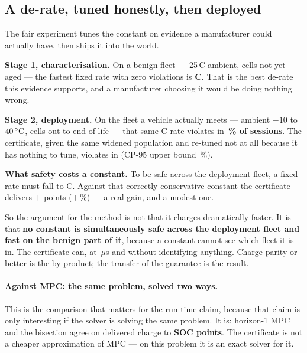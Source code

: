 \documentclass[11pt,letterpaper]{article}
\theoremstyle{definition}
\theoremstyle{remark}
\newcommand{\SI}[2]{#1\,#2}
\newcommand{\degreeCelsius}{\degC}
\newcommand{\degC}{\ifmmode{^\circ}\mathrm{C}\else\textdegree C\fi}
\begin{document}
\subsection{A de-rate, tuned honestly, then deployed}\label{sec:tuned}

The fair experiment tunes the constant on evidence a manufacturer could actually have, then
ships it into the world.

\textbf{Stage 1, characterisation.} On a benign fleet --- \SI{25}{\degreeCelsius} ambient, cells not yet
aged --- the fastest fixed rate with zero violations is \textbf{\bThreeTuned{}C}. That is the
best de-rate this evidence supports, and a manufacturer choosing it would be doing nothing
wrong.

\textbf{Stage 2, deployment.} On the fleet a vehicle actually meets --- ambient $-10$ to
$\SI{40}{\degreeCelsius}$, cells out to end of life --- that same \bThreeTuned{}C rate violates in
\textbf{\bThreeTunedViolPct\,\% of \bThreeTrials{} sessions}. The certificate, given the same
widened population and re-tuned not at all because it has nothing to tune, violates in
\textbf{\bThreeZgViol{}} (CP-95 upper bound \bThreeZgCP\,\%).

\textbf{What safety costs a constant.} To be safe across the deployment fleet, a fixed rate must
fall to \bThreeRequired{}C. Against that correctly conservative constant the certificate
delivers $+$\bThreeGainPts{} points ($+$\bThreeGainPct\,\%) --- a real gain, and a modest one.

So the argument for the method is not that it charges dramatically faster. It is that
\textbf{no constant is simultaneously safe across the deployment fleet and fast on the benign
part of it}, because a constant cannot see which fleet it is in. The certificate can, at
\worstLatency\,$\mu$s and without identifying anything. Charge parity-or-better is the
by-product; the transfer of the guarantee is the result.

\paragraph{Against MPC: the same problem, solved two ways.} This is the comparison that matters
for the run-time claim, because that claim is only interesting if the solver is solving the same
problem. It is: horizon-1 MPC and the bisection agree on delivered charge to
\textbf{\bMpcGap{} SOC points}. The certificate is not a cheaper approximation of MPC --- on
this problem it is an exact solver for it.
\end{document}

